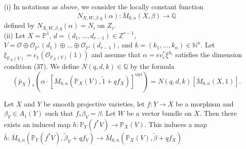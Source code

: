 \begin{definition}\label{manolacheVirtualPullbacks2012-def-5.20}
\label{manolacheVirtualPullbacks2012-locconst}(i) In notations as above, we consider the locally constant function
\begin{equation*}
N_{X,W,\beta,q}(\alpha):\overline{M}_{0,n}(X,\beta)\to\mathbb{Q}
\end{equation*}
defined  by $N_{X,W,\beta,q}(\alpha)=N_i$ on $Z_i$.
\\(ii) Let $X=\mathbb{P}^1$, $d=(d_1,...,d_{r-1})\in\mathbb{Z}^{r-1}$, $V=\mathcal{O}\oplus \mathcal{O}_{\mathbb{P}^1}(d_1)\oplus...\oplus\mathcal{O}_{\mathbb{P}^1}(d_{r-1})$,  and $k=(k_1,...,k_n)\in \mathbb{N}^n$. Let $\xi_{\mathbb{P}_X(V)}=c_1(\mathcal{O}_{\mathbb{P}_X(V)}(1))$ and assume that $\alpha=ev^*_i\xi^{k_i}$ satisfies the dimension condition (37). We define $N(q,d,k)\in \mathbb{Q}$ by the formula $$(\bar{p}_X)_*\left(\alpha\cdot[\overline{M}_{0,n}(\mathbb{P}_X(V),\tilde{1}+qf_X)]^{\mathrm{virt}}\right)=N(q,d, k)[\overline{M}_{0,n}(X,1)].$$
\end{definition}

\begin{remark}\label{manolacheVirtualPullbacks2012-rem-5.21}
Let $X$ and $Y$ be smooth projective varieties, let $f:Y\to X$ be a morphism and $\beta_Y\in A_1(Y)$ such that $f_*\beta_Y=\beta$. Let $W$ be a vector bundle on $X$. Then there exists an induced map $h:\mathbb{P}_Y(f^*V)\to\mathbb{P}_X(V)$. This induces a map $\bar{h}:\overline{M}_{0,n}(\mathbb{P}_Y(f^*V),\tilde{\beta}_Y+qf_Y)\to \overline{M}_{0,n}(\mathbb{P}_X(V),\tilde{\beta}+qf_X)$
\end{remark}

